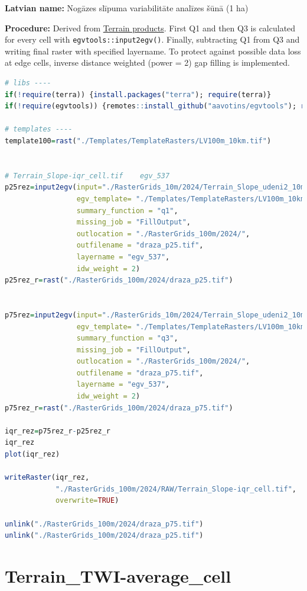 \documentclass[
]{book}
\newcommand{\passthrough}[1]{#1}
\begin{document}
\textbf{Latvian name:} Nogāzes slīpuma variabilitāte analīzes šūnā (1 ha)

\textbf{Procedure:} Derived from \hyperref[Ch05.01]{Terrain products}. First Q1 and then Q3
is calculated for every cell with \passthrough{\lstinline!egvtools::input2egv()!}. Finally, subtracting
Q1 from Q3 and writing final raster with specified layername. To protect against
possible data loss at edge cells, inverse distance weighted (power = 2) gap filling
is implemented.

\begin{lstlisting}[language=R]
# libs ----
if(!require(terra)) {install.packages("terra"); require(terra)}
if(!require(egvtools)) {remotes::install_github("aavotins/egvtools"); require(egvtools)}

# templates ----
template100=rast("./Templates/TemplateRasters/LV100m_10km.tif")


# Terrain_Slope-iqr_cell.tif    egv_537
p25rez=input2egv(input="./RasterGrids_10m/2024/Terrain_Slope_udeni2_10m.tif",
                 egv_template= "./Templates/TemplateRasters/LV100m_10km.tif",
                 summary_function = "q1",
                 missing_job = "FillOutput",
                 outlocation = "./RasterGrids_100m/2024/",
                 outfilename = "draza_p25.tif",
                 layername = "egv_537",
                 idw_weight = 2)
p25rez_r=rast("./RasterGrids_100m/2024/draza_p25.tif")


p75rez=input2egv(input="./RasterGrids_10m/2024/Terrain_Slope_udeni2_10m.tif",
                 egv_template= "./Templates/TemplateRasters/LV100m_10km.tif",
                 summary_function = "q3",
                 missing_job = "FillOutput",
                 outlocation = "./RasterGrids_100m/2024/",
                 outfilename = "draza_p75.tif",
                 layername = "egv_537",
                 idw_weight = 2)
p75rez_r=rast("./RasterGrids_100m/2024/draza_p75.tif")

iqr_rez=p75rez_r-p25rez_r
iqr_rez
plot(iqr_rez)

writeRaster(iqr_rez,
            "./RasterGrids_100m/2024/RAW/Terrain_Slope-iqr_cell.tif",
            overwrite=TRUE)

unlink("./RasterGrids_100m/2024/draza_p75.tif")
unlink("./RasterGrids_100m/2024/draza_p25.tif")
\end{lstlisting}

\section{Terrain\_TWI-average\_cell}\label{ch06.538}
\end{document}
